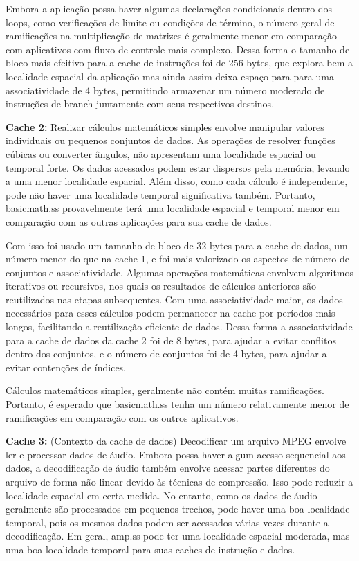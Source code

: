 \documentclass[12pt]{article}
\begin{document}
Embora a aplicação possa haver algumas declarações condicionais dentro dos loops, como verificações de limite ou condições de término, o número geral de ramificações na multiplicação de matrizes é geralmente menor em comparação com aplicativos com fluxo de controle mais complexo. Dessa forma o tamanho de bloco mais efeitivo para a cache de instruções foi de 256 bytes, que explora bem a localidade espacial da aplicação mas ainda assim deixa espaço para para uma associatividade de 4 bytes, permitindo armazenar um número moderado de instruções de branch juntamente com seus respectivos destinos.

\textbf{Cache 2:}
Realizar cálculos matemáticos simples envolve manipular valores individuais ou pequenos conjuntos de dados. As operações de resolver funções cúbicas ou converter ângulos, não apresentam uma localidade espacial ou temporal forte. Os dados acessados podem estar dispersos pela memória, levando a uma menor localidade espacial. Além disso, como cada cálculo é independente, pode não haver uma localidade temporal significativa também. Portanto, basicmath.ss provavelmente terá uma localidade espacial e temporal menor em comparação com as outras aplicações para sua cache de dados.

Com isso foi usado um tamanho de bloco de 32 bytes para a cache de dados, um número menor do que na cache 1, e foi mais valorizado os aspectos de número de conjuntos e associatividade. Algumas operações matemáticas envolvem algoritmos iterativos ou recursivos, nos quais os resultados de cálculos anteriores são reutilizados nas etapas subsequentes. Com uma associatividade maior, os dados necessários para esses cálculos podem permanecer na cache por períodos mais longos, facilitando a reutilização eficiente de dados. Dessa forma a associatividade para a cache de dados da cache 2 foi de 8 bytes, para ajudar a evitar conflitos dentro dos conjuntos, e o número de conjuntos foi de 4 bytes, para ajudar a evitar contenções de índices.

Cálculos matemáticos simples, geralmente não contém muitas ramificações. Portanto, é esperado que basicmath.ss tenha um número relativamente menor de ramificações em comparação com os outros aplicativos.


\textbf{Cache 3:}
(Contexto da cache de dados)
Decodificar um arquivo MPEG envolve ler e processar dados de áudio. Embora possa haver algum acesso sequencial aos dados, a decodificação de áudio também envolve acessar partes diferentes do arquivo de forma não linear devido às técnicas de compressão. Isso pode reduzir a localidade espacial em certa medida. No entanto, como os dados de áudio geralmente são processados em pequenos trechos, pode haver uma boa localidade temporal, pois os mesmos dados podem ser acessados várias vezes durante a decodificação. Em geral, amp.ss pode ter uma localidade espacial moderada, mas uma boa localidade temporal para suas caches de instrução e dados.
\end{document}
